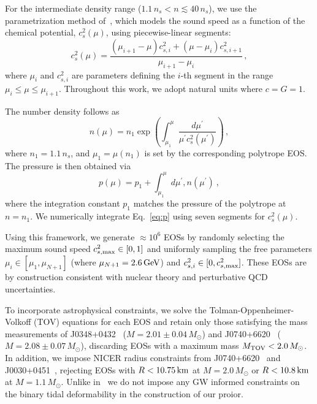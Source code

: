 \documentclass[twocolumn]{aastex631}
\begin{document}
For the intermediate density range ($1.1\,n_s < n \lesssim 40\,n_s$), we use the parametrization method of~\citet{Annala2019}, which models the sound speed as a function of the chemical potential, $c_s^2(\mu)$, using piecewise-linear segments:
\begin{equation} \label{eq:cs2}
 c_s^2(\mu) = \frac{\left(\mu_{i+1}-\mu \right) c_{s,i}^2 + \left(\mu - \mu_i \right) c_{s,i+1}^2}{\mu_{i+1}-\mu_i}\,, 
\end{equation}
where $\mu_i$ and $c_{s,i}^2$ are parameters defining the $i$-th segment in the range $\mu_i \leq \mu \leq \mu_{i+1}$.
Throughout this work, we adopt natural units where $c=G=1$.

The number density follows as 
\begin{equation} \label{eq:n}
 n(\mu) = n_1 \exp \left({\int_{\mu_1}^\mu \frac{d\mu^\prime}{\mu^\prime c_s^2(\mu^\prime)}}\right)\,, 
\end{equation} 
where $n_1 = 1.1\,n_s$, and $\mu_1 = \mu(n_1)$ is set by the corresponding polytrope EOS.
The pressure is then obtained via
\begin{equation} \label{eq:p}
 p(\mu) = p_1 + \int_{\mu_1}^\mu d\mu^\prime , n(\mu^\prime)~,
\end{equation}
where the integration constant $p_1$ matches the pressure of the polytrope at $n = n_1$.
We numerically integrate Eq.~\eqref{eq:p} using seven segments for $c_s^2(\mu)$.

Using this framework, we generate $\approx 10^6$ EOSs by randomly selecting the maximum sound speed $c_{s,{\rm max}}^2 \in [0,1]$ and uniformly sampling the free parameters $\mu_i \in [\mu_1, \mu_{N+1}]$ (where $\mu_{N+1} = 2.6\,\rm GeV$) and $c_{s,i}^2 \in [0, c_{s,{\rm max}}^2]$.
These EOSs are by construction consistent with nuclear theory and perturbative QCD uncertainties.

To incorporate astrophysical constraints, we solve the Tolman-Oppenheimer-Volkoff (TOV) equations for each EOS and retain only those satisfying the mass measurements of J0348+0432~\citep{Antoniadis2013} ($M = 2.01\pm 0.04\,M_{\odot}$) and J0740+6620~\citep{Cromartie2019, Fonseca2021} ($M = 2.08 \pm 0.07\,M_{\odot}$), discarding EOSs with a maximum mass $M_{\rm TOV} < 2.0\,M_{\odot}$. 
In addition, we impose NICER radius constraints from J0740+6620~\citep{Miller2021, Riley2021} and J0030+0451~\citep{Riley2019, MCMiller2019b}, rejecting EOSs with $R < 10.75\,\rm km$ at $M = 2.0\,M_{\odot}$ or $R < 10.8\,\rm km$ at $M = 1.1\,M_{\odot}$.
Unlike in~\citet{altiparmak22,Ecker:2022dlg} we do not impose any GW informed constraints on the binary tidal deformability in the construction of our proior.
	
\end{document}
